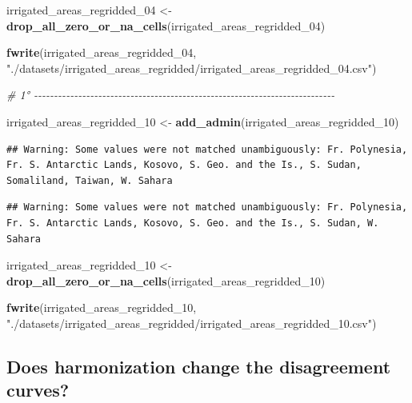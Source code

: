 \documentclass[
  11pt,
]{article}
\newenvironment{Shaded}{\begin{snugshade}}{\end{snugshade}}
\newcommand{\CommentTok}[1]{\textcolor[rgb]{0.56,0.35,0.01}{\textit{#1}}}
\newcommand{\FunctionTok}[1]{\textcolor[rgb]{0.13,0.29,0.53}{\textbf{#1}}}
\newcommand{\NormalTok}[1]{#1}
\newcommand{\OtherTok}[1]{\textcolor[rgb]{0.56,0.35,0.01}{#1}}
\newcommand{\StringTok}[1]{\textcolor[rgb]{0.31,0.60,0.02}{#1}}
\begin{document}
\begin{Shaded}
\begin{Highlighting}[]
\NormalTok{irrigated\_areas\_regridded\_04 }\OtherTok{\textless{}{-}} \FunctionTok{drop\_all\_zero\_or\_na\_cells}\NormalTok{(irrigated\_areas\_regridded\_04)}

\FunctionTok{fwrite}\NormalTok{(irrigated\_areas\_regridded\_04,}
       \StringTok{"./datasets/irrigated\_areas\_regridded/irrigated\_areas\_regridded\_04.csv"}\NormalTok{)}

\CommentTok{\# 1° {-}{-}{-}{-}{-}{-}{-}{-}{-}{-}{-}{-}{-}{-}{-}{-}{-}{-}{-}{-}{-}{-}{-}{-}{-}{-}{-}{-}{-}{-}{-}{-}{-}{-}{-}{-}{-}{-}{-}{-}{-}{-}{-}{-}{-}{-}{-}{-}{-}{-}{-}{-}{-}{-}{-}{-}{-}{-}{-}{-}{-}{-}{-}{-}{-}{-}{-}{-}{-}{-}{-}{-}{-}{-}{-}}

\NormalTok{irrigated\_areas\_regridded\_10 }\OtherTok{\textless{}{-}} \FunctionTok{add\_admin}\NormalTok{(irrigated\_areas\_regridded\_10)}
\end{Highlighting}
\end{Shaded}

\begin{verbatim}
## Warning: Some values were not matched unambiguously: Fr. Polynesia, Fr. S. Antarctic Lands, Kosovo, S. Geo. and the Is., S. Sudan, Somaliland, Taiwan, W. Sahara
\end{verbatim}

\begin{verbatim}
## Warning: Some values were not matched unambiguously: Fr. Polynesia, Fr. S. Antarctic Lands, Kosovo, S. Geo. and the Is., S. Sudan, W. Sahara
\end{verbatim}

\begin{Shaded}
\begin{Highlighting}[]
\NormalTok{irrigated\_areas\_regridded\_10 }\OtherTok{\textless{}{-}} \FunctionTok{drop\_all\_zero\_or\_na\_cells}\NormalTok{(irrigated\_areas\_regridded\_10)}

\FunctionTok{fwrite}\NormalTok{(irrigated\_areas\_regridded\_10,}
       \StringTok{"./datasets/irrigated\_areas\_regridded/irrigated\_areas\_regridded\_10.csv"}\NormalTok{)}
\end{Highlighting}
\end{Shaded}

\newpage

\subsection{Does harmonization change the disagreement
curves?}\label{does-harmonization-change-the-disagreement-curves}
\end{document}
